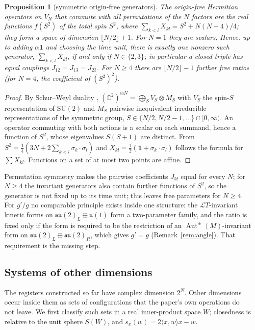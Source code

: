 \documentclass[aps,pra,onecolumn,superscriptaddress,nofootinbib,10pt]{revtex4-2}
\newtheorem{proposition}[theorem]{Proposition}
\theoremstyle{definition}
\theoremstyle{remark}
\newcommand{\C}{\mathbb{C}}
\newcommand{\su}{\mathfrak{su}}
\newcommand{\cL}{\mathcal{L}}
\newcommand{\Aut}{\operatorname{Aut}}
\newcommand{\ip}[2]{\langle #1,#2\rangle}
\newcommand{\SU}{\mathrm{SU}}
\begin{document}
\begin{proposition}[symmetric origin-free generators]\label{prop:symmetric}
The origin-free Hermitian operators on $V_N$ that commute with all permutations of the $N$ factors are
the real functions $f(S^2)$ of the total spin $S^2$, where $\sum_{k<l}X_{kl}=S^2+N(N-4)/4$; they form a
space of dimension $\lfloor N/2\rfloor+1$.  For $N=1$ they are scalars.  Hence, up to adding $\alpha\mathbf1$ and choosing the time unit,
there is exactly one nonzero such generator, $\sum_{k<l}X_{kl}$, if and only if $N\in\{2,3\}$; in particular a
closed triple has equal couplings $J_{12}=J_{13}=J_{23}$.  For $N\ge4$ there are
$\lfloor N/2\rfloor-1$ further free ratios (for $N=4$, the coefficient of $(S^2)^2$).
\end{proposition}
\begin{proof}
By Schur--Weyl duality \cite{GW}, $(\C^2)^{\otimes N}=\bigoplus_SV_S\otimes M_S$ with $V_S$ the spin-$S$
representation of $\SU(2)$ and $M_S$ pairwise inequivalent irreducible representations of the symmetric
group, $S\in\{N/2,N/2-1,\dots\}\cap[0,\infty)$.  An operator commuting with both actions is a scalar on each
summand, hence a function of $S^2$, whose eigenvalues $S(S+1)$ are distinct.  From
$S^2=\tfrac14(3N+2\sum_{k<l}\sigma_k\cdot\sigma_l)$ and $X_{kl}=\tfrac12(\mathbf1+\sigma_k\cdot\sigma_l)$ follows the
formula for $\sum X_{kl}$.  Functions on a set of at most two points are affine.
\end{proof}
Permutation symmetry makes the pairwise coefficients $J_{kl}$ equal for every $N$; for $N\ge4$ the invariant generators also contain further functions of $S^2$, so the generator is not fixed up to its time unit; this leaves free parameters for
$N\ge4$.  For $g'/g$ no comparable principle exists inside one structure: the $\cL T$-invariant kinetic
forms on $\su(2)_L\oplus\mathfrak u(1)$ form a two-parameter family, and the ratio is fixed only if the form
is required to be the restriction of an $\Aut^\pm(M)$-invariant form on $\su(2)_L\oplus\su(2)_R$, which
gives $g'=g$ (Remark~\ref{rem:angle}).  That requirement is the missing step.

\subsection{Systems of other dimensions}\label{sec:otherdim}
The registers constructed so far have complex dimension $2^N$.  Other dimensions occur inside them as
sets of configurations that the paper's own operations do not leave.  We first classify such sets
in a real inner-product space $W$; closedness is relative to the unit sphere $S(W)$, and $s_x(w)=2\ip xw x-w$.
\end{document}
